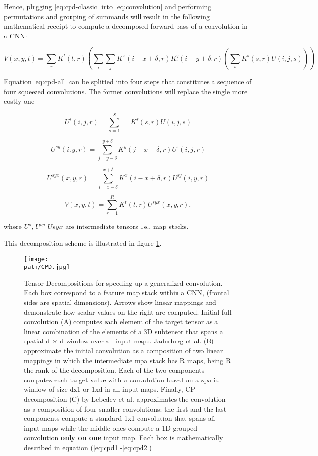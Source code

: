 Hence, plugging \ref{eq:cpd-classic} into \ref{eq:convolution} and performing permutations and grouping of summands will result in the following mathematical receipt to compute a decomposed forward pass of a convolution in a CNN: 

\begin{equation}
\label{eq:cpd-all}
	V(x, y, t)= \sum_r K^t(t,r) \left (\sum_i \sum_j K^x(i-x+\delta, r) K^y_r(i-y+\delta, r) \left (\sum_s 	K^s(s, r) U(i, j, s) \right ) \right ) 
\end{equation}  

Equation \ref{eq:cpd-all} can be splitted into four steps that constitutes a sequence of four squeezed convolutions. The former convolutions will replace the single more costly one: 

\begin{equation}
\label{eq:cpd1}
    U^s(i,j,r) =\sum^{S}_{s=1}=K^s(s,r)U(i,j,s)    
\end{equation}

\begin{equation}
    U^{sy}(i,y,r) = \sum_{j=y-\delta}^{y+\delta} K^y (j-x + \delta,r)U^{s}(i,j,r)
\end{equation}

\begin{equation}
    U^{syx}(x,y,r) = \sum_{i=x-\delta}^{x+\delta} K^x (i-x + \delta,r)U^{sy}(i,y,r)
\end{equation}

\begin{equation}
\label{eq:cpd2}
    V(x,y,t) = \sum_{r=1}^R K^t (t,r) U^{syx}(x,y,r),
\end{equation}

where $U^s$, $U^{sy}$ $U{syx}$ are intermediate tensors i.e., map stacks. 

This decomposition scheme is illustrated in figure \ref{fig:cpd-pass}. 

\begin{figure}[h!]
 \centering
 \texttt{[image: \\path/CPD.jpg]} 
 \caption{Tensor Decompositions for speeding up a generalized convolution. Each box correspond to a feature map stack within a CNN, (frontal sides are spatial dimensions). Arrows show linear mappings and demonstrate how scalar values on the right are computed. Initial full convolution (A) computes each element of the target tensor as a linear combination of the elements of a 3D subtensor that spans a spatial d × d window over all input maps. 
Jaderberg et al. (B) approximate the initial convolution as a composition of two linear mappings in which the intermediate mpa stack has R  maps, being R the rank of the decomposition. Each of the two-components 
computes each target value with a convolution based on a spatial window of size dx1 or 1xd in all input maps. Finally, CP-decomposition (C) by Lebedev et al. approximates the convolution as a composition of four smaller convolutions: the first and the last components compute a standard 1x1 convolution that spans all input maps while the middle ones compute a 1D grouped convolution \textbf{only on one} input map. Each box is mathematically described in equation (\ref{eq:cpd1}-\ref{eq:cpd2})}
 \label{fig:cpd-pass}
\end{figure}
\pagebreak


